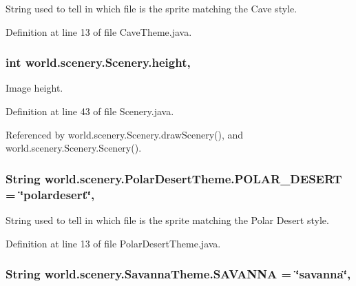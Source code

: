 String used to tell in which file is the sprite matching the Cave style. 



Definition at line 13 of file Cave\-Theme.\-java.

\hypertarget{a00024_a54b4edfa060087e78a829105bf62a900}{
\subsubsection[{height}]{\setlength{\rightskip}{0pt plus 5cm}int world.\-scenery.\-Scenery.\-height\hspace{0.3cm}{\ttfamily [protected]}, {\ttfamily [inherited]}}}\label{a00024_a54b4edfa060087e78a829105bf62a900}


Image height. 



Definition at line 43 of file Scenery.\-java.



Referenced by world.\-scenery.\-Scenery.\-draw\-Scenery(), and world.\-scenery.\-Scenery.\-Scenery().

\hypertarget{a00019_a48dd1801e0146ea2306dadcbdee81b77}{
\subsubsection[{P\-O\-L\-A\-R\-\_\-\-D\-E\-S\-E\-R\-T}]{\setlength{\rightskip}{0pt plus 5cm}String world.\-scenery.\-Polar\-Desert\-Theme.\-P\-O\-L\-A\-R\-\_\-\-D\-E\-S\-E\-R\-T = \char`\"{}polardesert\char`\"{}\hspace{0.3cm}{\ttfamily [static]}, {\ttfamily [inherited]}}}\label{a00019_a48dd1801e0146ea2306dadcbdee81b77}


String used to tell in which file is the sprite matching the Polar Desert style. 



Definition at line 13 of file Polar\-Desert\-Theme.\-java.

\hypertarget{a00023_a69e8a9867db3a93074a41573940424b2}{
\subsubsection[{S\-A\-V\-A\-N\-N\-A}]{\setlength{\rightskip}{0pt plus 5cm}String world.\-scenery.\-Savanna\-Theme.\-S\-A\-V\-A\-N\-N\-A = \char`\"{}savanna\char`\"{}\hspace{0.3cm}{\ttfamily [static]}, {\ttfamily [inherited]}}}\label{a00023_a69e8a9867db3a93074a41573940424b2}


